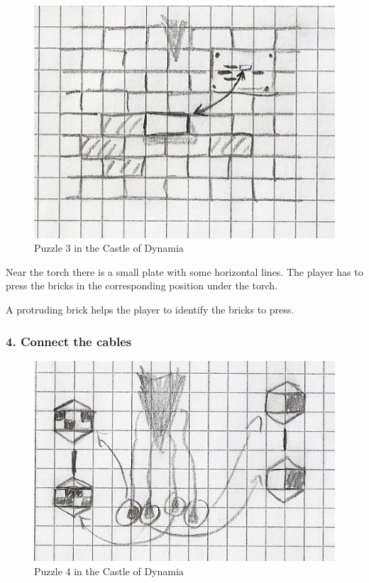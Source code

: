\begin{figure}[H]
  \centering
  \includegraphics[width=\textwidth]{Images/Puzzles/castleOfDynamia_3}
  \caption{Puzzle 3 in the Castle of Dynamia}
\end{figure}

Near the torch there is a small plate with some horizontal lines. The player has to press the bricks in the corresponding position under the torch.

A protruding brick helps the player to identify the bricks to press.

\subsubsection*{4. Connect the cables}

\begin{figure}[H]
  \centering
  \includegraphics[width=\textwidth]{Images/Puzzles/castleOfDynamia_4}
  \caption{Puzzle 4 in the Castle of Dynamia}
\end{figure}

